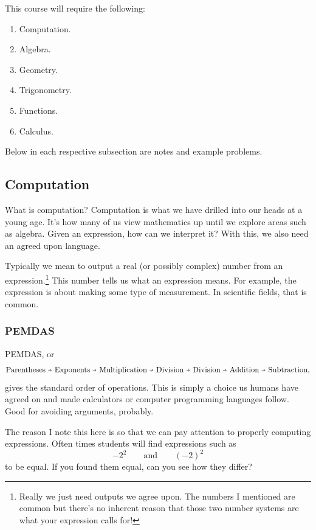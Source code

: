    This course will require the following:
    \begin{enumerate}[1.]
        \item Computation.
        \item Algebra.
        \item Geometry.
        \item Trigonometry.
        \item Functions.
        \item Calculus.
    \end{enumerate}
    
    \noindent Below in each respective subsection are notes and example problems.  
    
    \subsection{Computation}
    
    What is computation? Computation is what we have drilled into our heads at a young age.  It's how many of us view mathematics up until we explore areas such as algebra.  Given an expression, how can we interpret it?  With this, we also need an agreed upon language.
    
    Typically we mean to output a real (or possibly complex) number from an expression.\footnote{Really we just need outputs we agree upon. The numbers I mentioned are common but there's no inherent reason that those two number systems are what your expression calls for!} This number tells us what an expression means. For example, the expression is about making some type of measurement. In scientific fields, that is common.
    
    \subsubsection{PEMDAS}
    
    PEMDAS, or 
    \[
    \textrm{Parentheses $\veryshortarrow$ Exponents $\veryshortarrow$ Multiplication $\veryshortarrow$ Division $\veryshortarrow$ Division $\veryshortarrow$ Addition $\veryshortarrow$ Subtraction},
    \]
    gives the standard order of operations.  This is simply a choice us humans have agreed on and made calculators or computer programming languages follow.  Good for avoiding arguments, probably.
    
    The reason I note this here is so that we can pay attention to properly computing expressions.  Often times students will find expressions such as
    \[
    -2^2 \qquad \textrm{and} \qquad (-2)^2
    \]
    to be equal. If you found them equal, can you see how they differ?
    
